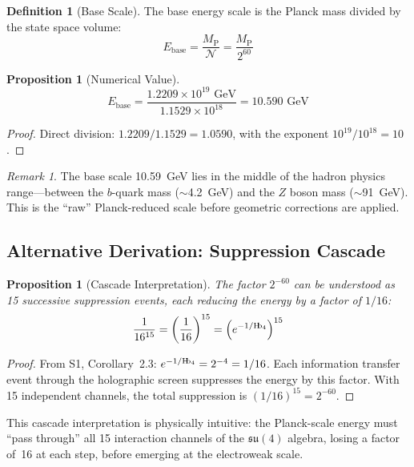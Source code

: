 \documentclass[11pt,a4paper]{article}
\newtheorem{proposition}[theorem]{Proposition}
\theoremstyle{definition}
\newtheorem{definition}[theorem]{Definition}
\theoremstyle{remark}
\newtheorem{remark}[theorem]{Remark}
\newcommand{\Hb}{\textnormal{H\kern-0.3em b}}
\newcommand{\Hbfour}{\Hb_4}
\newcommand{\Mpl}{M_{\mathrm{P}}}
\newcommand{\Ebase}{E_{\mathrm{base}}}
\newcommand{\NN}{\mathcal{N}}
\begin{document}
\begin{definition}[Base Scale]
\label{def:base}
The base energy scale is the Planck mass divided by the state space volume:
\begin{equation}
\Ebase = \frac{\Mpl}{\NN} = \frac{\Mpl}{2^{60}}
\end{equation}
\end{definition}

\begin{proposition}[Numerical Value]
\begin{equation}
\Ebase = \frac{1.2209 \times 10^{19}\text{ GeV}}{1.1529 \times 10^{18}} = 10.590 \text{ GeV}
\end{equation}
\end{proposition}

\begin{proof}
Direct division: $1.2209/1.1529 = 1.0590$, with the exponent $10^{19}/10^{18} = 10$.
\end{proof}

\begin{remark}
The base scale 10.59~GeV lies in the middle of the hadron physics range---between the $b$-quark mass ($\sim$4.2~GeV) and the $Z$ boson mass ($\sim$91~GeV). This is the ``raw'' Planck-reduced scale before geometric corrections are applied.
\end{remark}

\subsection{Alternative Derivation: Suppression Cascade}

\begin{proposition}[Cascade Interpretation]
\label{prop:cascade}
The factor $2^{-60}$ can be understood as 15 successive suppression events, each reducing the energy by a factor of $1/16$:
\begin{equation}
\frac{1}{16^{15}} = \left(\frac{1}{16}\right)^{15} = \left(e^{-1/\Hbfour}\right)^{15}
\end{equation}
\end{proposition}

\begin{proof}
From S1, Corollary~2.3: $e^{-1/\Hbfour} = 2^{-4} = 1/16$. Each information transfer event through the holographic screen suppresses the energy by this factor. With 15 independent channels, the total suppression is
$(1/16)^{15} = 2^{-60}$.
\end{proof}

This cascade interpretation is physically intuitive: the Planck-scale energy must ``pass through'' all 15 interaction channels of the $\mathfrak{su}(4)$ algebra, losing a factor of~16 at each step, before emerging at the electroweak scale.
\end{document}
